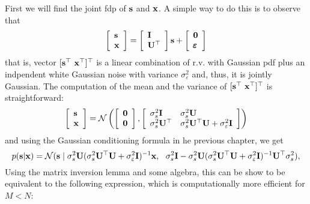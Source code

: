 First we will find the joint fdp of ${\mathbf s}$ and ${\mathbf x}$. A simple way to do this is to observe that
\begin{equation}
\left[\begin{array}{l} {\mathbf s} \\ {\mathbf x} \\ \end{array}\right] =
\left[\begin{array}{l} {\mathbf I} \\ {\mathbf U}^\top \\ \end{array}\right] {\mathbf s} + 
\left[\begin{array}{l} \bf 0 \\ \pmb{\varepsilon} \\ \end{array}\right]
\end{equation}
%
that is, vector $[{\mathbf s}^\top~{\mathbf x}^\top]^\top$ is a linear combination of r.v. with Gaussian pdf plus an indpendent white Gaussian noise with variance $\sigma_\varepsilon^2$ and, thus, it is jointly Gaussian. The computation of the mean and the variance of $[{\mathbf s}^\top~{\mathbf x}^\top]^\top$ is straightforward:
%
\begin{equation}
\left[\begin{array}{l} {\mathbf s} \\ {\mathbf x} \end{array}\right]
    = {\mathcal N}\left(
    	\left[\begin{array}{l}  \bf 0 \\ \bf 0 \end{array}\right],
        \left[\begin{array}{ll} \sigma_s^2{\mathbf I}     & \sigma_s^2{\mathbf U} \\
                                \sigma_s^2{\mathbf U}^\top & \sigma_s^2{\mathbf U}^\top{\mathbf U} + 
                                                     \sigma_\varepsilon^2 {\mathbf I}
              \end{array}\right] \right)
\label{eq:jointsx}
\end{equation}
and using the Gaussian conditioning formula in he previous chapter, we get
\begin{equation}
p({\mathbf s}|{\mathbf x}) 
	= {\mathcal N}({\mathbf s} \mid \sigma_s^2 {\mathbf U}(\sigma_s^2{\mathbf U}^\top{\mathbf U} + \sigma_\varepsilon^2{\mathbf I})^{-1} {\mathbf x},~~
\sigma_s^2{\mathbf I} - \sigma_s^2{\mathbf U}(\sigma_s^2{\mathbf U}^\top{\mathbf U} + \sigma_\varepsilon^2{\mathbf I})^{-1} {\mathbf U}^\top \sigma_s^2
) ,
\end{equation}
%
Using the matrix inversion lemma and some algebra, this can be show to be equivalent to the following expression, which is computationally more efficient for $M<N$:
